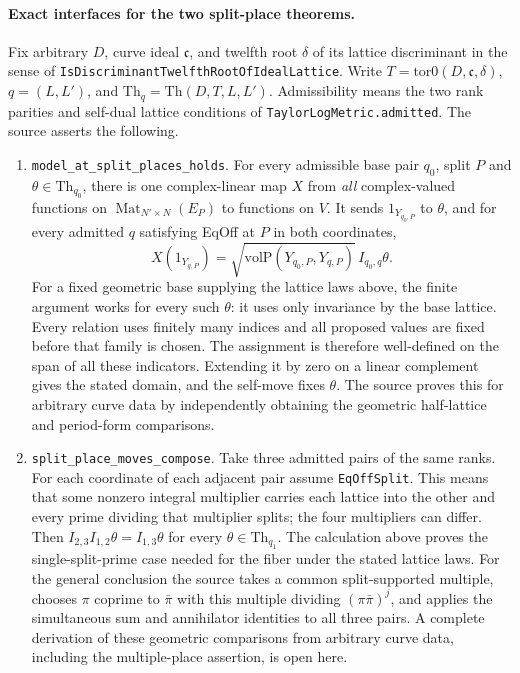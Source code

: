 \paragraph{Exact interfaces for the two split-place theorems.}
Fix arbitrary \(D\), curve ideal \(\mathfrak c\), and twelfth root
\(\delta\) of its lattice discriminant in the sense of
\nolinkurl{IsDiscriminantTwelfthRootOfIdealLattice}. Write
\(T=\mathrm{tor0}(D,\mathfrak c,\delta)\), \(q=(L,L')\), and
\(\mathrm{Th}_q=\mathrm{Th}(D,T,L,L')\). Admissibility means the two
rank parities and self-dual lattice conditions of
\nolinkurl{TaylorLogMetric.admitted}. The source asserts the following.
\begin{enumerate}
\item \nolinkurl{model_at_split_places_holds}. For every admissible
base pair \(q_0\), split \(P\) and \(\theta\in\mathrm{Th}_{q_0}\),
there is one complex-linear map \(X\) from \emph{all} complex-valued
functions on \(\operatorname{Mat}_{N'\times N}(E_P)\) to functions on
\(V\). It sends \(1_{Y_{q_0,P}}\) to \(\theta\), and for every admitted
\(q\) satisfying EqOff at \(P\) in both coordinates,
\[
 X(1_{Y_{q,P}})=\sqrt{\mathrm{volP}(Y_{q_0,P},Y_{q,P})}\,
 I_{q_0,q}\theta .
\]
For a fixed geometric base supplying the lattice laws above, the finite
argument works for every such \(\theta\): it uses only invariance by
the base lattice. Every relation uses finitely many indices and all
proposed values are fixed before that family is chosen.
The assignment is therefore well-defined on the span of all these
indicators. Extending it by zero on a linear complement gives the stated
domain, and the self-move fixes \(\theta\).
The source proves this for arbitrary curve data by independently obtaining
the geometric half-lattice and period-form comparisons.
\item \nolinkurl{split_place_moves_compose}. Take three admitted pairs
of the same ranks. For each coordinate of each adjacent pair assume
\nolinkurl{EqOffSplit}. This means that some nonzero integral multiplier
carries each lattice into the other and every prime dividing that
multiplier splits; the four multipliers can differ. Then
\(I_{2,3}I_{1,2}\theta=I_{1,3}\theta\) for every
\(\theta\in\mathrm{Th}_{q_1}\). The calculation above proves the
single-split-prime case needed for the fiber under the stated lattice
laws. For the general conclusion the source takes a common split-supported
multiple, chooses \(\pi\) coprime to \(\bar\pi\) with this multiple
dividing \((\pi\bar\pi)^j\), and applies the simultaneous sum and
annihilator identities to all three pairs. A complete derivation of these
geometric comparisons from arbitrary curve data, including the
multiple-place assertion, is open here.
\end{enumerate}
